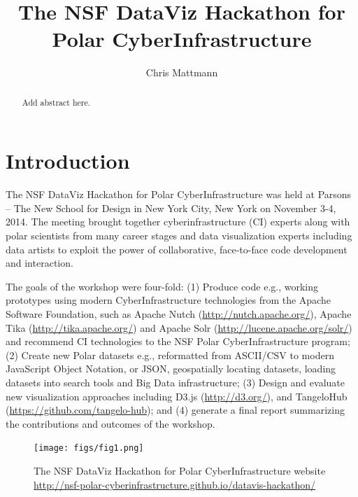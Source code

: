 \documentclass[11pt]{article}
\begin{document}
\title{The NSF DataViz Hackathon for Polar CyberInfrastructure}
\author{Chris Mattmann}

\maketitle
\begin{abstract}
Add abstract here.
\end{abstract}


\section{Introduction}
The NSF DataViz Hackathon for Polar CyberInfrastructure was held at Parsons -- The New School for Design in New York City, New York on November 3-4, 2014. The meeting brought together cyberinfrastructure (CI) experts along with polar scientists from many career stages and data visualization experts including data artists to exploit the power of collaborative, face-to-face code development and interaction. 

The goals of the workshop were four-fold: (1) Produce code e.g., working prototypes using modern CyberInfrastructure technologies from the Apache Software Foundation, such as Apache Nutch (\url{http://nutch.apache.org/}), Apache Tika (\url{http://tika.apache.org/}) and Apache Solr (\url{http://lucene.apache.org/solr/}) and recommend CI technologies to the NSF Polar CyberInfrastructure program; (2) Create new Polar datasets e.g., reformatted from ASCII/CSV to modern JavaScript Object Notation, or JSON, geospatially locating datasets, loading datasets into search tools and Big Data infrastructure; (3) Design and evaluate new visualization approaches including D3.js (\url{http://d3.org/}), and TangeloHub (\url{https://github.com/tangelo-hub}); and (4) generate a final report summarizing the contributions and outcomes of the workshop. 

\begin{figure}[htp]
    \centering
    \texttt{[image: figs/fig1.png]}
    \caption{The NSF DataViz Hackathon for Polar CyberInfrastructure website \protect\url{http://nsf-polar-cyberinfrastructure.github.io/datavis-hackathon/}}
    \label{fig:website}
\end{figure}
\end{document}
